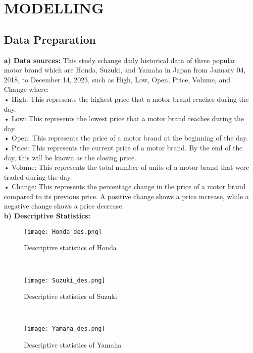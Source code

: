 \documentclass{ieeeojies}
\begin{document}
\section{MODELLING}
\label{sec:modelling}
\subsection{Data Preparation}
\textbf{a) Data sources:}
This study schange daily historical data of three popular
motor brand which are Honda, Suzuki, and Yamaha in Japan from January 04, 2018, to December 14, 2023, such as High, Low, Open, Price, Volume, and Change where:\\
• High: This represents the highest price that a motor brand reaches during the day.\\
• Low: This represents the lowest price that a motor brand reaches during the day.\\
• Open: This represents the price of a motor brand at the beginning of the day.\\
• Price: This represents the current price of a motor brand. By the end of the day, this will be known as the closing price.\\
• Volume: This represents the total number of units of a motor brand that were traded during the day.\\
• Change: This represents the percentage change in the price of a motor brand compared to its previous price. A positive change shows a price increase, while a negative change shows a price decrease.\\
\textbf{b) Descriptive Statistics:}\\
\begin{figure} [H]
    \centering
    \texttt{[image: Honda\_des.png]}
    \caption{Descriptive statistics of Honda}
    \label{fig:enter-label}
\end{figure}\\
\begin{figure} [H]
    \centering
    \texttt{[image: Suzuki\_des.png]}
    \caption{Descriptive statistics of Suzuki}
    \label{fig:enter-label}
\end{figure}\\
\begin{figure} [H]
    \centering
    \texttt{[image: Yamaha\_des.png]}
    \caption{Descriptive statistics of Yamaha}
    \label{fig:enter-label}
\end{figure}\\
\end{document}
